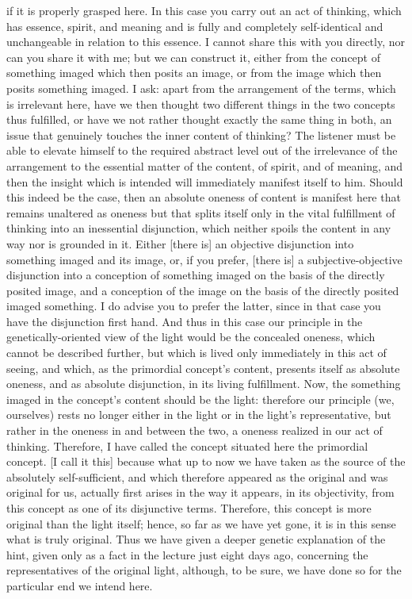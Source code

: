 if it is properly grasped here.
In this case you carry out an act of thinking,
which has essence, spirit, and meaning
and is fully and completely self-identical
and unchangeable in relation to this essence.
I cannot share this with you directly,
nor can you share it with me;
but we can construct it,
either from the concept of something imaged
which then posits an image,
or from the image which then posits something imaged.
I ask: apart from the arrangement of the terms,
which is irrelevant here,
have we then thought two different things
in the two concepts thus fulfilled,
or have we not rather thought exactly the same thing in both,
an issue that genuinely touches the inner content of thinking?
The listener must be able to elevate himself
to the required abstract level
out of the irrelevance of the arrangement
to the essential matter of the content,
of spirit, and of meaning, and
then the insight which is intended will
immediately manifest itself to him.
Should this indeed be the case,
then an absolute oneness of content is
manifest here that remains unaltered as oneness
but that splits itself only in
the vital fulfillment of
thinking into an inessential disjunction,
which neither spoils the content
in any way nor is grounded in it.
Either [there is] an objective disjunction
into something imaged and its image,
or, if you prefer, [there is]
a subjective-objective disjunction
into a conception of something imaged
on the basis of the directly posited image,
and a conception of the image on the basis of
the directly posited imaged something.
I do advise you to prefer the latter,
since in that case you have
the disjunction first hand.
And thus in this case our principle
in the genetically-oriented view of the light
would be the concealed oneness,
which cannot be described further,
but which is lived only immediately
in this act of seeing, and which,
as the primordial concept’s content,
presents itself as absolute oneness,
and as absolute disjunction,
in its living fulfillment.
Now, the something imaged
in the concept’s content
should be the light:
therefore our principle (we, ourselves)
rests no longer either in the light
or in the light’s representative,
but rather in the oneness in and between the two,
a oneness realized in our act of thinking.
Therefore, I have called the concept situated here
the primordial concept.
[I call it this] because what up to now
we have taken as the source
of the absolutely self-sufficient,
and which therefore appeared as the original
and was original for us,
actually first arises in the way it appears,
in its objectivity,
from this concept
as one of its disjunctive terms.
Therefore, this concept is more original
than the light itself;
hence, so far as we have yet gone,
it is in this sense what is truly original.
Thus we have given a deeper genetic explanation of the hint,
given only as a fact in the lecture just eight days ago,
concerning the representatives of the original light,
although, to be sure, we have done so
for the particular end we intend here.

